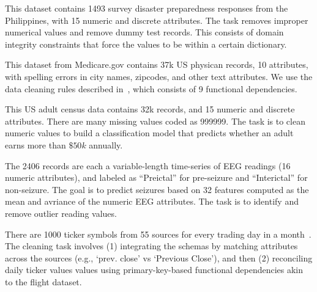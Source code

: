 

 This dataset contains 1493 survey disaster preparedness responses from the Philippines, with 15 numeric and discrete attributes. The task removes improper numerical values and remove dummy test records. This consists of domain integrity constraints that force the values to be within a certain dictionary.

 This dataset from Medicare.gov contains 37k US physican records, 10 attributes, with spelling errors in city names, zipcodes, and other text attributes. We use the data cleaning rules described in~\cite{rekatsinas2017holoclean}, which consists of 9 functional dependencies. 

 This US adult census data contains 32k records, and 15 numeric and discrete attributes.  There are many missing values coded as 999999.  The task is to clean numeric values to build a classification model that predicts whether an adult earns more than $\$50k$ annually. 

  The 2406 records are each a variable-length time-series of EEG readings (16 numeric attributes), and labeled as ``Preictal'' for pre-seizure and ``Interictal'' for non-seizure.  The goal is to predict seizures based on 32 features computed as the mean and avriance of the numeric EEG attributes.  The task is to identify and remove outlier reading values.  


 There are 1000 ticker symbols from 55 sources for every trading day in a month~\cite{data-flights}.  The cleaning task involves (1) integrating the schemas by matching attributes across the sources (e.g., `prev. close' vs `Previous Close'), and then (2) reconciling daily ticker values values using primary-key-based functional dependencies akin to the flight dataset.

